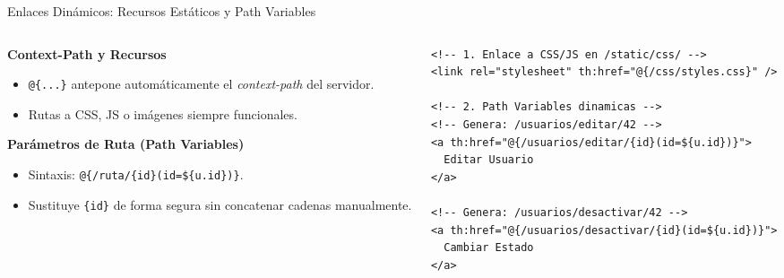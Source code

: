 \documentclass[aspectratio=169]{beamer}
\begin{document}


\begin{frame}[fragile]{Enlaces Din\'amicos: Recursos Est\'aticos y Path Variables}
\begin{columns}[c]
\begin{column}{0.48\textwidth}
  \textbf{Context-Path y Recursos}
  \begin{itemize}
    \item \texttt{@\{...\}} antepone autom\'aticamente el \textit{context-path} del servidor.
    \item Rutas a CSS, JS o im\'agenes siempre funcionales.
  \end{itemize}
  \vspace{3pt}
  \textbf{Par\'ametros de Ruta (Path Variables)}
  \begin{itemize}
    \item Sintaxis: \texttt{@\{/ruta/\{id\}(id=\$\{u.id\})\}}.
    \item Sustituye \texttt{\{id\}} de forma segura sin concatenar cadenas manualmente.
  \end{itemize}
\end{column}
\begin{column}{0.50\textwidth}
\begin{lstlisting}[style=ThymeleafStyle]
<!-- 1. Enlace a CSS/JS en /static/css/ -->
<link rel="stylesheet" th:href="@{/css/styles.css}" />

<!-- 2. Path Variables dinamicas -->
<!-- Genera: /usuarios/editar/42 -->
<a th:href="@{/usuarios/editar/{id}(id=${u.id})}">
  Editar Usuario
</a>

<!-- Genera: /usuarios/desactivar/42 -->
<a th:href="@{/usuarios/desactivar/{id}(id=${u.id})}">
  Cambiar Estado
</a>
\end{lstlisting}
\end{column}
\end{columns}
\end{frame}
\end{document}
